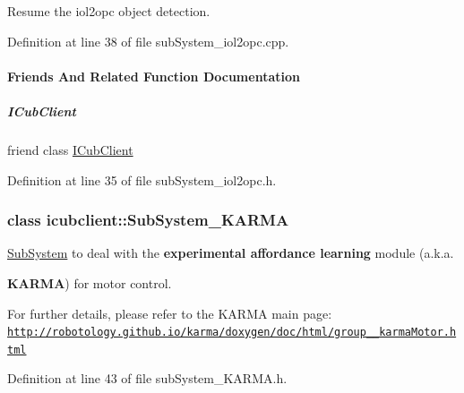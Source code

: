 Resume the iol2opc object detection. 



Definition at line 38 of file sub\+System\+\_\+iol2opc.\+cpp.



\paragraph{Friends And Related Function Documentation}
\mbox{\label{group__icubclient__subsystems_a56c42753f30380d8abf4a96bc322b3b0}} 
\subparagraph{\texorpdfstring{I\+Cub\+Client}{ICubClient}}
{\footnotesize\ttfamily friend class \hyperlink{group__icubclient__clients_classicubclient_1_1ICubClient}{I\+Cub\+Client}\hspace{0.3cm}{\ttfamily [friend]}}



Definition at line 35 of file sub\+System\+\_\+iol2opc.\+h.

\label{classicubclient_1_1SubSystem__KARMA}
\subsubsection{class icubclient\+:\+:Sub\+System\+\_\+\+K\+A\+R\+MA}
\hyperlink{group__icubclient__subsystems_classicubclient_1_1SubSystem}{Sub\+System} to deal with the {\bfseries experimental affordance learning} module (a.\+k.\+a. 

{\bfseries K\+A\+R\+MA}) for motor control.

For further details, please refer to the K\+A\+R\+MA main page\+: \href{http://robotology.github.io/karma/doxygen/doc/html/group__karmaMotor.html}{\tt http\+://robotology.\+github.\+io/karma/doxygen/doc/html/group\+\_\+\+\_\+karma\+Motor.\+html} 

Definition at line 43 of file sub\+System\+\_\+\+K\+A\+R\+M\+A.\+h.




